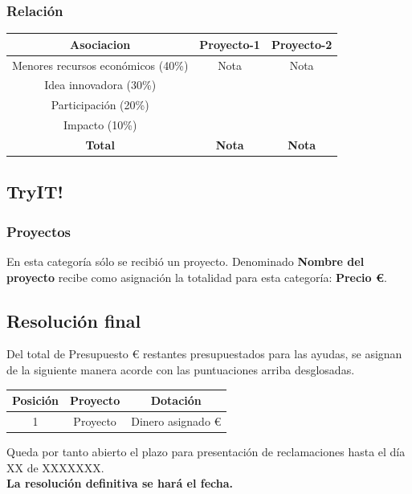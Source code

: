 \documentclass[12pt, a4paper, spanish]{article}
\begin{document}
    \subsubsection{Relación}
        \begin{center}
            \begin{tabular}{|c|c|c|}
                \hline
                Asociacion & Proyecto-1 & Proyecto-2 \\
                \hline
                Menores recursos económicos (40\%) & Nota & Nota \\
                \hline
                Idea innovadora (30\%) &  & \\
                \hline
                Participación (20\%) &  &  \\
                \hline
                Impacto (10\%) &  &  \\
                \hline \hline
                \textbf{Total} & \textbf{Nota} & \textbf{Nota} \\
                \hline
            \end{tabular}
        \end{center}
    \newpage
    
    \subsection{TryIT!}
        \subsubsection{Proyectos}
        En esta categoría sólo se recibió un proyecto. Denominado \textbf{Nombre del proyecto} recibe como asignación la totalidad para esta categoría: \textbf{Precio \euro{}}.
    \newpage
    \subsection{Resolución final}
    Del total de Presupuesto \euro{} restantes presupuestados para las ayudas, se asignan de la siguiente manera acorde con las puntuaciones arriba desglosadas.
        \begin{center}
            \begin{tabular}{|c|c|c|}
                \hline
                \textbf{Posición} & \textbf{Proyecto} & \textbf{Dotación} \\
                \hline
                1 & Proyecto & Dinero asignado \euro{} \\
                \hline
            \end{tabular}
        \end{center}
    Queda por tanto abierto el plazo para presentación de reclamaciones hasta el día XX de XXXXXXX. \\
    \textbf{La resolución definitiva se hará el fecha.}
\end{document}
